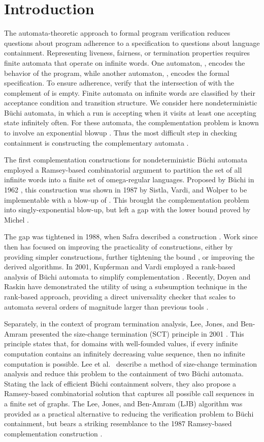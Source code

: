 \documentclass{LMCS}
\newcommand\buchi{B\"uchi }
\begin{document}
\section{Introduction}\label{Sect:Introduction}
The automata-theoretic approach to formal program verification reduces questions
about program adherence to a specification to questions about language
containment. Representing liveness, fairness, or termination properties requires
finite automata that operate on infinite words.  One automaton, , encodes
the behavior of the program, while another automaton, , encodes the formal
specification.  To ensure adherence, verify that the intersection of  with
the complement of  is empty.  Finite automata on infinite words are
classified by their acceptance condition and transition structure. We consider
here nondeterministic \buchi automata, in which a run is accepting when it
visits at least one accepting state infinitely often. For these automata, the
complementation problem is known to involve an exponential blowup \cite{Mic88}.  Thus the most
difficult step in checking containment is constructing the complementary
automata .  

The first complementation constructions for nondeterministic \buchi automata
employed a Ramsey-based combinatorial argument to partition the set of
all infinite words into a finite set of omega-regular languages. Proposed by \buchi in
1962 \cite{Buc62}, this construction was shown in 1987 by Sistla, Vardi, and
Wolper to be implementable with a blow-up of  \cite{SVW85}. This
brought the complementation problem into singly-exponential blow-up, but left a
gap with the  lower bound proved by Michel \cite{Mic88}.

The gap was tightened in 1988, when Safra described a 
construction \cite{Saf88}. Work since then has focused on improving the
practicality of  constructions, either by providing simpler
constructions, further tightening the bound \cite{Sch09}, or improving the derived
algorithms. In 2001, Kupferman and Vardi employed a rank-based analysis of \buchi
automata to simplify complementation \cite{KV01c}.  Recently, Doyen and Raskin
have demonstrated the utility of using a subsumption technique in the
rank-based approach, providing a direct universality checker that scales to
automata several orders of magnitude larger than previous tools \cite{DR09}. 

Separately, in the context of program termination analysis, Lee, Jones, and
Ben-Amram presented the size-change termination (SCT) principle in 2001
\cite{LJB01}.  This principle states that, for domains with well-founded values,
if every infinite computation contains an infinitely decreasing value sequence,
then no infinite computation is possible. Lee et al.~ describe a method of
size-change termination analysis and reduce this problem to the containment of
two \buchi automata. Stating the lack of efficient \buchi containment solvers,
they also propose a Ramsey-based combinatorial solution that captures all
possible call sequences in a finite set of graphs.  The Lee, Jones, and
Ben-Amram (LJB) algorithm was provided as a practical alternative to reducing
the verification problem to \buchi containment, but bears a striking resemblance
to the 1987 Ramsey-based complementation construction \cite{SVW85}.
\end{document}
